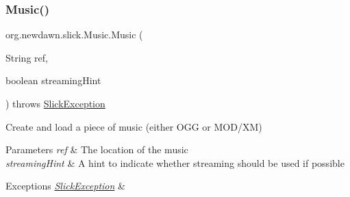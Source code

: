 \mbox{\label{classorg_1_1newdawn_1_1slick_1_1_music_a726446e0ec108da9d7e93db9a2738439}} 
\subsubsection{\texorpdfstring{Music()}{Music()}\hspace{0.1cm}{\footnotesize\ttfamily [5/5]}}
{\footnotesize\ttfamily org.\+newdawn.\+slick.\+Music.\+Music (\begin{DoxyParamCaption}\item[{String}]{ref,  }\item[{boolean}]{streaming\+Hint }\end{DoxyParamCaption}) throws \mbox{\hyperlink{classorg_1_1newdawn_1_1slick_1_1_slick_exception}{Slick\+Exception}}\hspace{0.3cm}{\ttfamily [inline]}}

Create and load a piece of music (either O\+GG or M\+O\+D/\+XM)


\begin{DoxyParams}{Parameters}
{\em ref} & The location of the music \\
\hline
{\em streaming\+Hint} & A hint to indicate whether streaming should be used if possible \\
\hline
\end{DoxyParams}

\begin{DoxyExceptions}{Exceptions}
{\em \mbox{\hyperlink{classorg_1_1newdawn_1_1slick_1_1_slick_exception}{Slick\+Exception}}} & \\
\hline
\end{DoxyExceptions}

